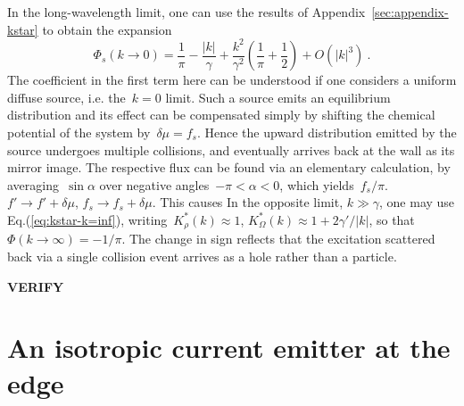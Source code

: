 \documentclass[preprint,aps,eqsecnum, prb]{revtex4-1}
\begin{document}
In the long-wavelength limit, one can  use  the results of
Appendix~\ref{sec:appendix-kstar} to obtain the expansion
\begin{equation}
  \label{eq:phi-s-low}
  \Phi_s(k\to 0) = \frac{1}{\pi} - \frac{|k|}{\gamma} + \frac{k^2}{\gamma^2}
  \left(\frac{1}{\pi} + \frac{1}{2}\right)
  + O(|k|^3)
  \ .
\end{equation}
The coefficient in the first term here can be understood if one
considers a uniform diffuse source, i.e. the~$k = 0$ limit.
Such a source emits an equilibrium distribution and its effect
can be compensated simply by shifting the chemical potential
of the system by~$\delta\mu = f_s$. Hence the upward distribution
emitted by the source undergoes multiple collisions,
and eventually arrives back at the wall as its mirror image.
The respective flux can be found via an elementary calculation,
by averaging~$\sin\alpha$ over negative angles~$-\pi < \alpha < 0$,
which yields~$f_s/\pi$.
$f' \to f' + \delta\mu$, $f_s \to f_s +  \delta\mu$. This causes
In the opposite limit, $k \gg \gamma$, one
may use Eq.(\ref{eq:kstar-k=inf}), writing~$K^\ast_\rho(k) \approx 1$,
$K_\Omega^\ast(k) \approx 1 + 2\gamma'/|k|$, 
so that~$\Phi(k \to\infty) = - 1/\pi$.
The change in sign reflects that the excitation scattered back via a single
collision event arrives as a hole rather than a particle. 

\textbf{VERIFY}

\section{An isotropic current emitter at the edge}
\label{sec:boundary-src}
\end{document}
